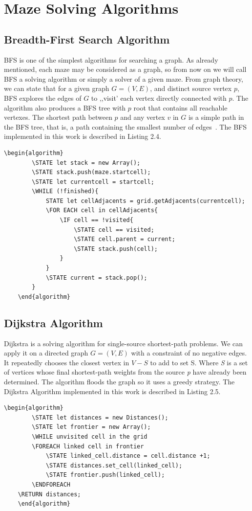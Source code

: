 \section{Maze Solving Algorithms}
\subsection{Breadth-First Search Algorithm}
BFS is one of the simplest algorithms for searching a graph. As already mentioned, each maze may be considered as a graph, so from now on we will call 
BFS  a solving algorithm or simply a solver of a given maze. From graph theory, we can state that for a given graph $ G = ( V, E) $, and distinct source 
vertex $p$, BFS explores the edges of $G$ to ,,visit’ each vertex directly connected with $p$. The algorithm also produces a BFS tree with $p$ root that 
contains all reachable vertexes. The shortest path between $p$ and any vertex $v$ in $G$ is a simple path in the BFS tree, that is, a path containing
the smallest number of edges~\cite{16}. The BFS implemented in this work is described in Listing 2.4.\newline
\begin{lstlisting}[caption={Pseudocode for a BFS algorithm. Source: developped by the author, based on~\cite{16}.}]
	\begin{algorithm}
		\STATE let stack = new Array();
		\STATE stack.push(maze.startcell);
		\STATE let currentcell = startcell;
		\WHILE (!finished){
			STATE let cellAdjacents = grid.getAdjacents(currentcell);
			\FOR EACH cell in cellAdjacents{
				\IF cell == !visited{
					\STATE cell == visited;
					\STATE cell.parent = current;
					\STATE stack.push(cell);
				}
			}
			\STATE current = stack.pop();
		}
	\end{algorithm}	
\end{lstlisting}	

\subsection{Dijkstra Algorithm}
Dijkstra is a solving algorithm for single-source shortest-path problems. We can apply it on a directed graph $G=(V, E)$ with a constraint of no negative edges. 
It repeatedly chooses the closest vertex in $V-S$ to add to set S. 
Where \textit{S} is a set of vertices whose final shortest-path weights from the source \textit{p} have already been determined.
The algorithm floods the graph so it uses a greedy strategy. The Dijkstra Algorithm implemented in this work is described in Listing 2.5.\\
\begin{lstlisting}[caption={Pseudocode for a Dijkstra’s algorithm.Source: developped by the author, based on~\cite{18}.}]
	\begin{algorithm}
		\STATE let distances = new Distances();
		\STATE let frontier = new Array();
		\WHILE unvisited cell in the grid
		\FOREACH linked cell in frontier
			\STATE linked_cell.distance = cell.distance +1;
			\STATE distances.set_cell(linked_cell);
			\STATE frontier.push(linked_cell);
	    \ENDFOREACH
	\RETURN distances;
	\end{algorithm}
	\end{lstlisting}

